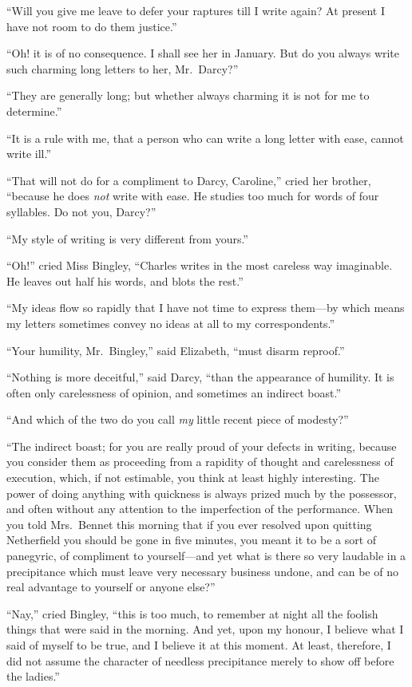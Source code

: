 ``Will you give me leave to defer your raptures till I write again?
At present I have not room to do them justice.''

``Oh! it is of no consequence.  I shall see her in January.  But do
you always write such charming long letters to her, Mr.\ Darcy?''

``They are generally long; but whether always charming it is not
for me to determine.''

``It is a rule with me, that a person who can write a long letter
with ease, cannot write ill.''

``That will not do for a compliment to Darcy, Caroline,'' cried
her brother, ``because he does \emph{not} write with ease.  He studies
too much for words of four syllables.  Do not you, Darcy?''

``My style of writing is very different from yours.''

``Oh!'' cried Miss Bingley, ``Charles writes in the most careless
way imaginable.  He leaves out half his words, and blots the
rest.''

``My ideas flow so rapidly that I have not time to express
them---by which means my letters sometimes convey no ideas
at all to my correspondents.''

``Your humility, Mr.\ Bingley,'' said Elizabeth, ``must disarm
reproof.''

``Nothing is more deceitful,'' said Darcy, ``than the appearance of
humility.  It is often only carelessness of opinion, and sometimes
an indirect boast.''

``And which of the two do you call \emph{my} little recent piece of
modesty?''

``The indirect boast; for you are really proud of your defects in
writing, because you consider them as proceeding from a
rapidity of thought and carelessness of execution, which, if not
estimable, you think at least highly interesting.  The power of
doing anything with quickness is always prized much by the
possessor, and often without any attention to the imperfection of
the performance.  When you told Mrs.\ Bennet this morning that
if you ever resolved upon quitting Netherfield you should be
gone in five minutes, you meant it to be a sort of panegyric, of
compliment to yourself---and yet what is there so very laudable
in a precipitance which must leave very necessary business
undone, and can be of no real advantage to yourself or anyone
else?''

``Nay,'' cried Bingley, ``this is too much, to remember at night all
the foolish things that were said in the morning.  And yet, upon
my honour, I believe what I said of myself to be true, and I
believe it at this moment.  At least, therefore, I did not assume
the character of needless precipitance merely to show off before
the ladies.''

